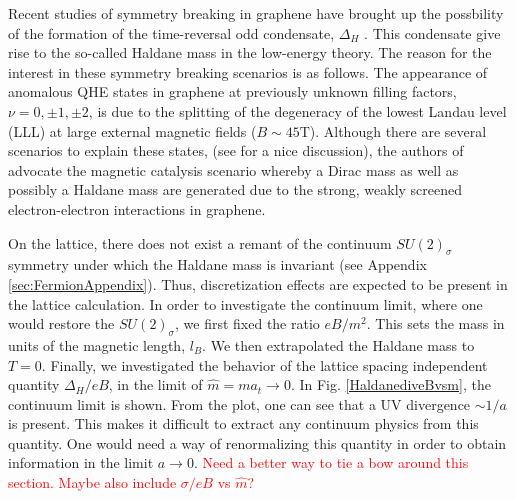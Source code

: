 \documentclass[aps,prd,twocolumn,showpacs,superscriptaddress,groupedaddress]{revtex4}  %
\begin{document}
Recent studies of symmetry breaking in graphene have brought up the possbility of the formation of the time-reversal odd condensate, $\Delta_H$ \cite{MiranskyGraphene2,MiranskyGraphene3}. This condensate give rise to the so-called Haldane mass in the low-energy theory.
The reason for the interest in these symmetry breaking scenarios is as follows.
The appearance of anomalous QHE states in graphene at previously unknown filling factors, $\nu = 0, \pm 1, \pm 2$, is due to the splitting of the degeneracy of the lowest Landau level (LLL) at large external magnetic fields ($B \sim 45 \text{T}$).
Although there are several scenarios to explain these states, (see \cite{Yang} for a nice discussion), the authors of \cite{MiranskyGraphene2, MiranskyGraphene3} advocate the magnetic catalysis scenario whereby a Dirac mass as well as possibly a Haldane mass are generated due to the strong, weakly screened
electron-electron interactions in graphene.

On the lattice, there does not exist a remant of the continuum $SU(2)_{\sigma}$ symmetry under which the Haldane mass is invariant (see Appendix \ref{sec:FermionAppendix}). Thus, discretization effects are expected to be present in the lattice calculation. In order to investigate the continuum limit, where one would restore the $SU(2)_{\sigma}$, we first fixed the ratio $eB/m^2$. This sets the mass in units of the magnetic length, $l_B$. We then extrapolated the Haldane mass to $T=0$. Finally, we investigated the behavior of the lattice spacing independent quantity $\Delta_H/eB$, in the limit of $\hat{m} = m a_t \to 0$. 
In Fig. \ref{HaldanediveBvsm}, the continuum limit is shown. From the plot, one can see that a UV divergence $\sim 1/a$ is present. This makes it difficult to extract any continuum physics from this quantity. One would need a way of renormalizing this quantity in order to obtain information in the limit $a \to 0$.
\textcolor{red}{Need a better way to tie a bow around this section. Maybe also include $\sigma/eB$ vs $\hat{m}$?}
\end{document}
